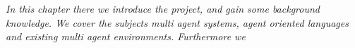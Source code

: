 \textit{In this chapter there we introduce the project, and gain some background knowledge. We cover the subjects multi agent systems, agent oriented languages and existing multi agent environments. Furthermore we }